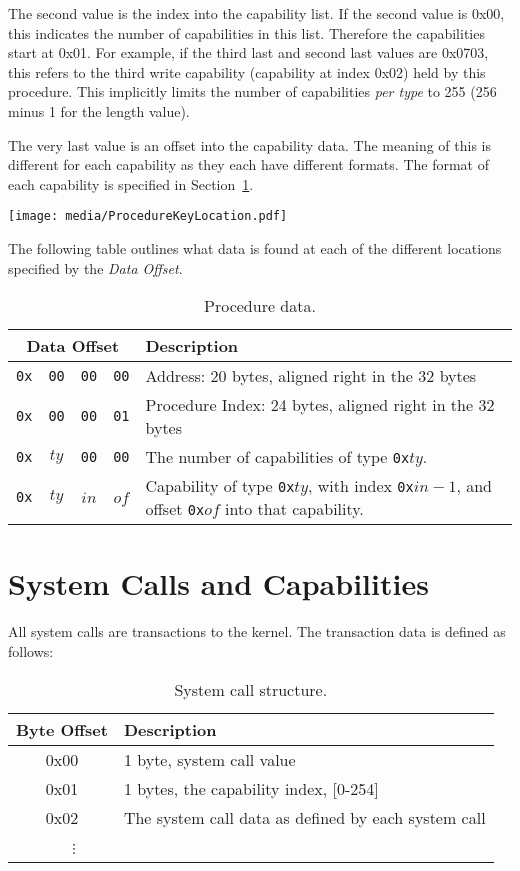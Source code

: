 \documentclass[english,a4paper]{article}
\begin{document}
The second value is the index into the capability list. If the second value is
0x00, this indicates the number of capabilities in this list. Therefore the
capabilities start at 0x01. For example, if the third last and second last
values are 0x0703, this refers to the third write capability (capability at
index 0x02) held by this procedure. This implicitly limits the number of
capabilities \emph{per type} to 255 (256 minus 1 for the length value).

The very last value is an offset into the capability data. The meaning of this
is different for each capability as they each have different formats. The format
of each capability is specified in Section~\ref{syscalls-and-caps}.

\texttt{[image: media/ProcedureKeyLocation.pdf]}

The following table outlines what data is found at each of the different
locations specified by the \emph{Data Offset}.

\begin{table}[H]
  \caption{Procedure data.}
  \centering{}%
  \begin{tabularx}{\textwidth}{c | c | c | c | X }
    \hline
    \multicolumn{4}{c|}{Data Offset} & Description \\
    \hline
    \hline
    \texttt{0x} & \texttt{00} & \texttt{00} & \texttt{00} & Address: 20 bytes,
      aligned right in the 32 bytes \\
    \texttt{0x} & \texttt{00} & \texttt{00} & \texttt{01} & Procedure Index: 24 bytes,
      aligned right in the 32 bytes \\
    \texttt{0x} & \texttt{$ty$} & \texttt{00} & \texttt{00} & The number of
      capabilities of type \texttt{0x$ty$}. \\
    \texttt{0x} & \texttt{$ty$} & \texttt{$in$} & \texttt{$of$} & Capability of
      type \texttt{0x$ty$}, with index \texttt{0x$in-1$}, and offset
      \texttt{0x$of$} into that capability. \\
    \hline
  \end{tabularx}
\end{table}

\section{System Calls and Capabilities}\label{syscalls-and-caps}
All system calls are transactions to the kernel. The transaction data is defined
as follows:

\begin{table}[H]
  \caption{System call structure.}
  \centering{}%
  \begin{tabularx}{\textwidth}{c|X}
    \hline
    Byte Offset & Description\\
    \hline
    \hline
    0x00 & 1 byte, system call value \\
    0x01 & 1 bytes, the capability index, [0-254] \\
    0x02 & The system call data as defined by each system call \\
    ~~~$\vdots$ &  \\
    \hline
  \end{tabularx}
\end{table}
\end{document}
